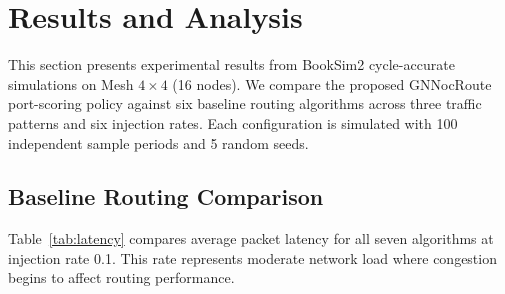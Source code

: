 \section{Results and Analysis}
\label{sec:results}

This section presents experimental results from BookSim2 cycle-accurate simulations on Mesh $4\times4$ (16 nodes). We compare the proposed GNNocRoute port-scoring policy against six baseline routing algorithms across three traffic patterns and six injection rates. Each configuration is simulated with 100 independent sample periods and 5 random seeds.

\subsection{Baseline Routing Comparison}

Table~\ref{tab:latency} compares average packet latency for all seven algorithms at injection rate 0.1. This rate represents moderate network load where congestion begins to affect routing performance.

\begin{table}[h]
\centering
\caption{Average packet latency (cycles) on Mesh $4\times4$ at injection rate 0.1 (mean $\pm$ 95\% CI, 5 seeds)}
\label{tab:latency}
\small
{}
\end{table}

